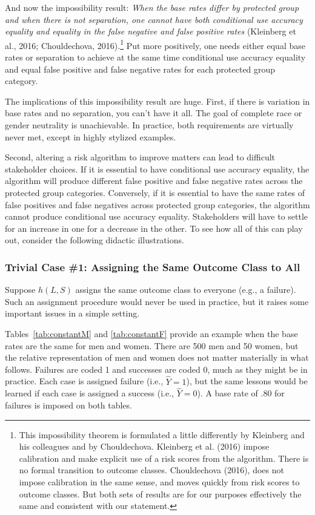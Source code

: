 \documentclass[12pt]{article}
\begin{document}
And now the impossibility result:  \textit{When the base rates differ by protected group and when there is not separation, one cannot have both conditional use accuracy equality and equality in the false negative and false positive rates} (Kleinberg et al., 2016; Chouldechova, 2016).\footnote
{
This impossibility theorem is formulated a little differently by Kleinberg and his colleagues and by Chouldechova. Kleinberg et al. (2016) impose calibration and make explicit use of a risk scores from the algorithm. There is no formal transition to outcome classes. Chouldechova (2016), does not impose calibration in the same sense, and moves quickly from risk scores to outcome classes. But both sets of results are for our purposes effectively the same and consistent with our statement. 
} 
Put more positively, one needs either equal base rates or separation to achieve at the same time conditional use accuracy equality and equal false positive and false negative rates for each protected group category.

The implications of this impossibility result are huge. First, if there is variation in base rates and no separation, you can't have it all. The goal of complete race or gender neutrality is unachievable. In practice, both requirements are virtually never met, except in highly stylized examples.

Second, altering a risk algorithm to improve matters can lead to difficult stakeholder choices. If it is essential to have conditional use accuracy equality, the algorithm will produce different false positive and false negative rates across the protected group categories. Conversely, if it is essential to have the same rates of false positives and false negatives across protected group categories, the algorithm cannot  produce conditional use accuracy equality. Stakeholders will have to settle for an increase in one for a decrease in the other. To see how all of this can play out, consider the following didactic illustrations.

\subsubsection{Trivial Case \#1: Assigning the Same Outcome Class to All}

Suppose $h(L,S)$ assigns the same outcome class to everyone (e.g., a failure).  Such an assignment procedure would never be used in practice, but it raises some important issues in a simple setting.

Tables~\ref{tab:constantM} and \ref{tab:constantF} provide an example when the base rates are the same for men and women. There are 500 men and 50 women, but the relative representation of men and women does not matter materially in what follows. Failures are coded 1 and successes are coded 0, much as they might be in practice. Each case is assigned failure (i.e., $\hat{Y}=1$), but the same lessons would be learned if each case is assigned a success (i.e., $\hat{Y} = 0$).  A base rate of .80 for failures is imposed on both tables.
\end{document}
